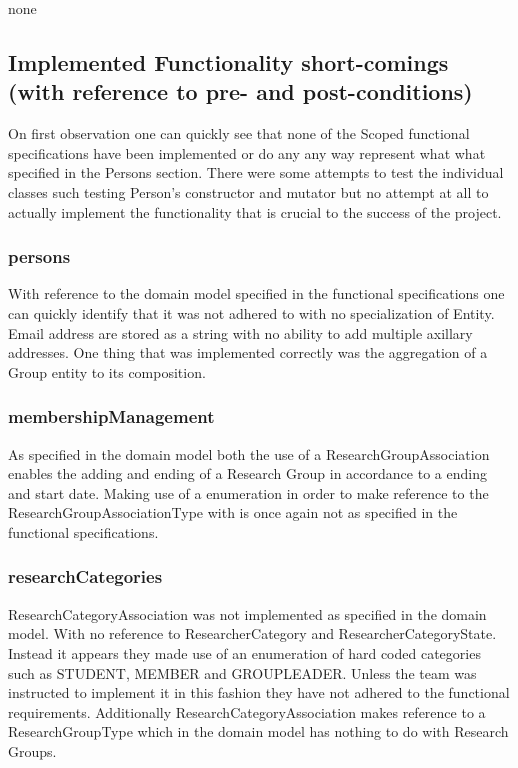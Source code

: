 \documentclass{article}
\begin{document}
	none

    \subsection{Implemented Functionality short-comings (with reference to pre- and post-conditions)}
    
    	On first observation one can quickly see that none of the Scoped functional specifications have been implemented or do any any way represent what what specified in the Persons section. There were some attempts to test the individual classes such testing Person's constructor and mutator but no attempt at all to actually implement the functionality that is crucial to the success of the project.
	
		\subsubsection{persons}
		With reference to the domain model specified in the functional specifications one can quickly identify that it was not adhered to with no specialization of Entity. Email address are stored as a string with no ability to add multiple axillary addresses. One thing that was implemented correctly was the aggregation of a Group entity to its composition.

		\subsubsection{membershipManagement}
		As specified in the domain model both the use of a ResearchGroupAssociation enables the adding and ending of a Research Group in accordance to a ending and start date. Making use of a enumeration in order to make reference to the ResearchGroupAssociationType with is once again not as specified in the functional specifications. 

		\subsubsection{researchCategories}
		ResearchCategoryAssociation was not implemented as specified in the domain model. With no reference to ResearcherCategory and ResearcherCategoryState. Instead it appears they made use of an enumeration of hard coded categories such as STUDENT, MEMBER and GROUPLEADER. Unless the team was instructed to implement it in this fashion they have not adhered to the functional requirements. Additionally ResearchCategoryAssociation makes reference to a ResearchGroupType which in the domain model has nothing to do with Research Groups.
\end{document}
